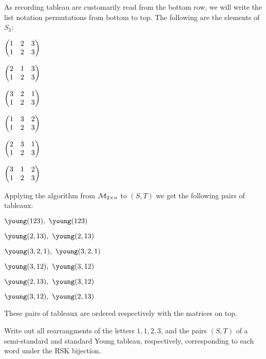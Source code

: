 \documentclass[12pt]{memoir}
\begin{document}
\begin{ptcbr}
    As recording tableau are customarily read from the bottom row, we will write the list notation permutations from bottom to top. The following are the elements of $S_3$:
    \begin{enumerate}[i)]
        \begin{multicols*}{3}
        \item $\begin{pmatrix} 1 & 2 & 3\\ 1 & 2 & 3 \end{pmatrix}$
        \item $\begin{pmatrix} 2 & 1 & 3\\ 1 & 2 & 3 \end{pmatrix}$
        \item $\begin{pmatrix} 3 & 2 & 1\\ 1 & 2 & 3 \end{pmatrix}$
        \item $\begin{pmatrix} 1 & 3 & 2\\ 1 & 2 & 3 \end{pmatrix}$
        \item $\begin{pmatrix} 2 & 3 & 1\\ 1 & 2 & 3 \end{pmatrix}$
        \item $\begin{pmatrix} 3 & 1 & 2\\ 1 & 2 & 3 \end{pmatrix}$
        \end{multicols*}
        \end{enumerate}
    Applying the algorithm from $\mathcal{M}_{2\times n}$ to $(S,T)$ we get the following pairs of tableaux:
    \begin{enumerate}[i)]
        \begin{multicols*}{3}
        \item $\young(123),\ \young(123)$
        \item $\young(2,13),\ \young(2,13)$
        \item $\young(3,2,1),\ \young(3,2,1)$
        \item $\young(3,12),\ \young(3,12)$ 
        \item $\young(2,13),\ \young(3,12)$
        \item $\young(3,12),\ \young(2,13)$
    \end{multicols*}
\end{enumerate}
    These pairs of tableaux are ordered respectively with the matrices on top. 
\end{ptcbr}

\begin{Ej}[Exercise 4]
    Write out all rearrangments of the letters $1, 1, 2, 3$, and the pairs $(S, T )$ of a semi-standard
and standard Young tableau, respectively, corresponding to each word under the RSK bijection.
\end{Ej}
\end{document}
